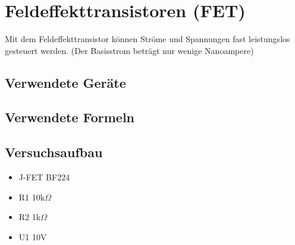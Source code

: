 \documentclass[12pt,a4paper]{article}
\begin{document}
\section{Feldeffekttransistoren (FET)}
Mit dem Feldeffekttransistor können Ströme und Spannungen fast leistungslos gesteuert werden. (Der Basisstrom beträgt nur wenige Nanoampere)
\subsection{Verwendete Geräte}

\subsection{Verwendete Formeln}
\subsection{Versuchsaufbau}

\begin{itemize}
\item	J-FET BF224

\item	R1 10k$\Omega$

\item	R2 1k$\Omega$

\item	U1 10V
\end{itemize}
\end{document}
